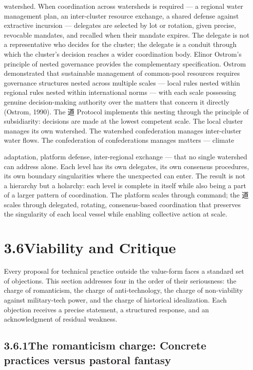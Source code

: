 watershed. When coordination across watersheds is required — a regional water management plan, an inter-cluster resource exchange, a shared defense against extractive incursion — delegates are selected by lot or rotation, given precise, revocable mandates, and recalled when their mandate expires. The delegate is not a representative who decides for the cluster; the delegate is a conduit through which the cluster’s decision reaches a wider coordination body. Elinor Ostrom’s principle of nested governance provides the complementary specification. Ostrom demonstrated that sustainable management of common-pool resources requires governance structures nested across multiple scales — local rules nested within regional rules nested within international norms — with each scale possessing genuine decision-making authority over the matters that concern it directly (Ostrom, 1990). The 道 Protocol implements this nesting through the principle of subsidiarity: decisions are made at the lowest competent scale. The local cluster manages its own watershed. The watershed confederation manages inter-cluster water flows. The confederation of confederations manages matters — climate

adaptation, platform defense, inter-regional exchange — that no single watershed can address alone. Each level has its own delegates, its own consensus procedures, its own boundary singularities where the unexpected can enter. The result is not a hierarchy but a holarchy: each level is complete in itself while also being a part of a larger pattern of coordination. The platform scales through command; the 道 scales through delegated, rotating, consensus-based coordination that preserves the singularity of each local vessel while enabling collective action at scale.

\section{3.6\quad Viability and Critique}

Every proposal for technical practice outside the value-form faces a standard set of objections. This section addresses four in the order of their seriousness: the charge of romanticism, the charge of anti-technology, the charge of non-viability against military-tech power, and the charge of historical idealization. Each objection receives a precise statement, a structured response, and an acknowledgment of residual weakness.

\subsection{3.6.1\quad The romanticism charge: Concrete practices versus pastoral fantasy}

